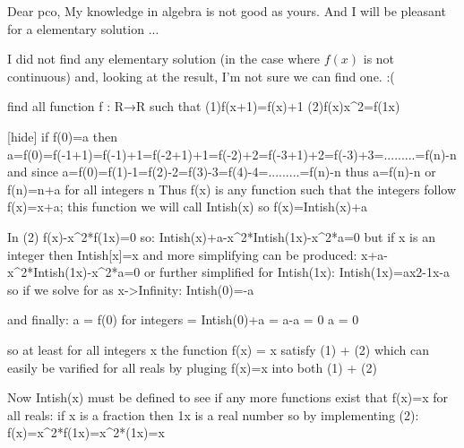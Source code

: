 \begin{solution}
	\begin{tcolorbox}Dear pco,
My knowledge in algebra is not good as yours. And I will be pleasant for a elementary solution ...  \end{tcolorbox}

I did not find any elementary solution (in the case where $ f(x)$ is not continuous) and, looking at the result, I'm not sure we can find one.  :(
\end{solution}



\begin{solution}
	\begin{tcolorbox}find all function f : R→R such that
(1)f(x+1)=f(x)+1
(2)f(x)\/x^2=f(1\/x)\end{tcolorbox}

[hide]
if f(0)=a then a=f(0)=f(-1+1)=f(-1)+1=f(-2+1)+1=f(-2)+2=f(-3+1)+2=f(-3)+3=.........=f(n)-n 
and since a=f(0)=f(1)-1=f(2)-2=f(3)-3=f(4)-4=.........=f(n)-n
thus a=f(n)-n or f(n)=n+a for all integers n
Thus f(x) is any function such that the integers follow f(x)=x+a; this function we will call Intish(x) so f(x)=Intish(x)+a

In (2)
f(x)-x^2*f(1\/x)=0 so:
Intish(x)+a-x^2*Intish(1\/x)-x^2*a=0  but if x is an integer then Intish[x]=x and more simplifying can be produced:
x+a-x^2*Intish(1\/x)-x^2*a=0 or further simplified for Intish(1\/x):
Intish(1\/x)=a\/x2-1\/x-a so if we solve for as x->Infinity:
Intish(0)=-a 

and finally:
a = f(0) {for integers} = Intish(0)+a = a-a = 0 
a = 0

so at least for all integers x the function f(x) = x satisfy (1) + (2) {which can easily be varified for all reals by pluging f(x)=x into both (1) + (2)}

Now Intish(x) must be defined to see if any more functions exist that f(x)=x for all reals:
if x is a fraction then 1\/x is a real number so by implementing (2):
f(x)=x^2*f(1\/x)=x^2*(1\/x)=x


\end{solution}
